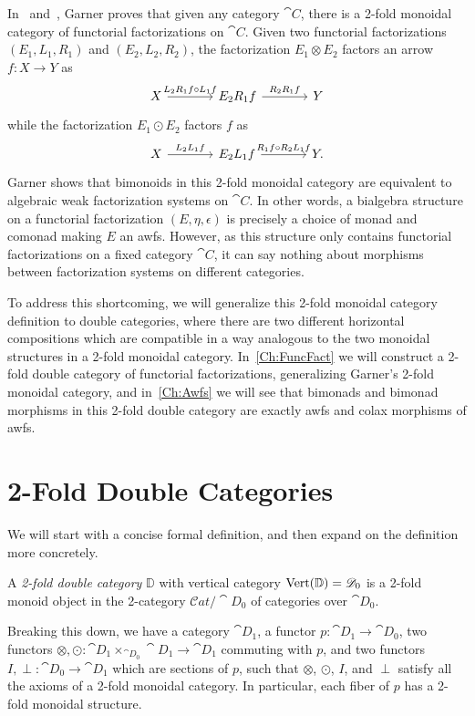 In~\cite{garner:nwfs} and~\cite{garner:soa}, Garner proves that given any category $\cat{C}$, there is a 2-fold monoidal category of functorial factorizations on $\cat{C}$. Given two functorial factorizations $(E_1,L_1,R_1)$ and $(E_2,L_2,R_2)$, the factorization $E_1\otimes E_2$ factors an arrow $f\colon X\to Y$ as
\[
\begin{tikzcd}[column sep=large]
	X \rar{L_2R_1f\circ L_1f} & E_2R_1f \rar{R_2R_1f} & Y
\end{tikzcd}
\]
while the factorization $E_1\odot E_2$ factors $f$ as
\[
\begin{tikzcd}[column sep=large]
	X \rar{L_2L_1f} & E_2L_1 f \rar{R_1f\circ R_2L_1f} & Y.
\end{tikzcd}
\]
Garner shows that bimonoids in this 2-fold monoidal category are equivalent to algebraic weak factorization systems on $\cat{C}$. In other words, a bialgebra structure on a functorial factorization $(E,\eta,\epsilon)$ is precisely a choice of monad and comonad making $E$ an awfs. However, as this structure only contains functorial factorizations on a fixed category $\cat{C}$, it can say nothing about morphisms between factorization systems on different categories.

To address this shortcoming, we will generalize this 2-fold monoidal category definition to double categories, where there are two different horizontal compositions which are compatible in a way analogous to the two monoidal structures in a 2-fold monoidal category. In~\cref{Ch:FuncFact} we will construct a 2-fold double category of functorial factorizations, generalizing Garner's 2-fold monoidal category, and in~\cref{Ch:Awfs} we will see that bimonads and bimonad morphisms in this 2-fold double category are exactly awfs and colax morphisms of awfs.

\section{2-Fold Double Categories}

We will start with a concise formal definition, and then expand on the definition more concretely.

\begin{definition}
	A \emph{2-fold double category} $\mathbb{D}$ with vertical category $\operatorname{Vert}(\mathbb{D})=\mathscr{D}_0$ is a 2-fold monoid object in the 2-category $\mathcal{C}at/\cat{D}_0$ of categories over $\cat{D}_0$.
\end{definition}

Breaking this down, we have a category $\cat{D}_1$, a functor $p\colon\cat{D}_1\to\cat{D}_0$, two functors $\otimes, \odot\colon \cat{D}_1\times_{\cat{D}_0}\cat{D}_1\to\cat{D}_1$ commuting with $p$, and two functors $I,\perp\colon\cat{D}_0\to\cat{D}_1$ which are sections of $p$, such that $\otimes$, $\odot$, $I$, and $\perp$ satisfy all the axioms of a 2-fold monoidal category. In particular, each fiber of $p$ has a 2-fold monoidal structure.

